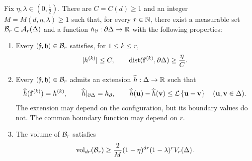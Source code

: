 \documentclass[11pt,letterpaper]{article}
\begin{document}
\begin{lemma}\label{lem:matching}
      Fix $\eta,\lambda\in (0,\frac12)$. There are $C=C(d)\ge 1$ and an integer $M=M(d,\eta,\lambda)\ge1$ such that, for every $r\in\mathbb N$, there exist a measurable set $\mathcal B_r\subset\mathcal A_r(\Delta)$ and a function $h_\partial:\partial\Delta\to\mathbb R$ with the following properties:
      \begin{enumerate}[label=\textup{(\roman*)},ref=\textup{(\roman*)},leftmargin=*]
            \item \label{item:fit-bounds}
                  Every $(\bm{\mathfrak f},\mathfrak h)\in\mathcal B_r$ satisfies, for $1\le k\le r$,
                  \[
                        |h^{(k)}|\le C, \qquad \operatorname{dist}(\mathbf f^{(k)},\partial\Delta)\ge\frac{\eta}{C}.
                  \]
            \item \label{item:fit-extension}
                  Every $(\bm{\mathfrak f},\mathfrak h)\in\mathcal B_r$ admits an extension $\widehat h:\Delta\to\mathbb R$ such that
                  \[
                        \widehat h(\mathbf f^{(k)})=h^{(k)},\qquad \widehat h|_{\partial\Delta}=h_\partial,\qquad \widehat h(\mathbf u)-\widehat h(\mathbf v)\le\mathcal L\left\{\mathbf u-\mathbf v\right\} \quad(\mathbf u,\mathbf v\in\Delta).
                  \]
                  The extension may depend on the configuration, but its boundary values do not. The common boundary function may depend on $r$.
            \item \label{item:fit-volume}
                  The volume of $\mathcal B_r$ satisfies
                  \begin{equation}\label{eq:matching}
                        \operatorname{vol}_{dr}(\mathcal B_r)\ge\frac{2}M(1-\eta)^{dr}(1-\lambda)^r V_r(\Delta).
                  \end{equation}
      \end{enumerate}
\end{lemma}
\end{document}
